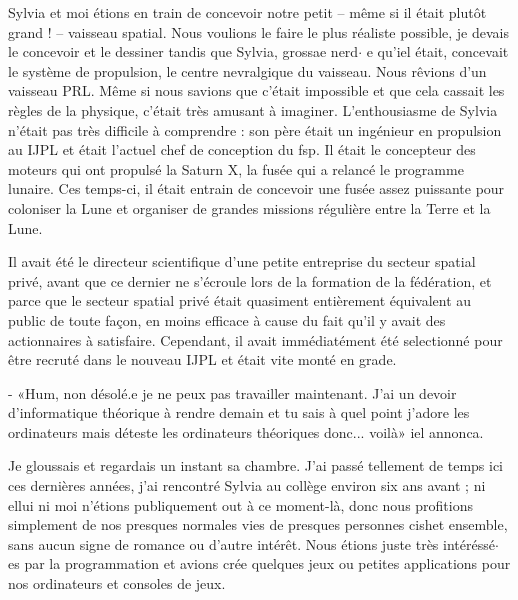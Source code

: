 \documentclass[12pt,hidelinks,a4paper]{book}
\begin{document}
Sylvia et moi étions en train de concevoir notre petit -- même si
il était plutôt grand ! -- vaisseau spatial. Nous voulions le faire
le plus réaliste possible, je devais le concevoir et le dessiner tandis
que Sylvia, grossae nerd$\cdot$ e qu'iel était, concevait le système de propulsion,
le centre nevralgique du vaisseau. Nous rêvions d'un vaisseau PRL.
Même si nous savions que c'était impossible et que cela cassait les
règles de la physique, c'était très amusant à imaginer. L'enthousiasme
de Sylvia n'était pas très difficile à comprendre : son père était
un ingénieur en propulsion au IJPL et était l'actuel chef de conception
du \gls{fsp}. Il était le concepteur des moteurs qui ont propulsé
la Saturn X, la fusée qui a relancé le programme lunaire. Ces temps-ci,
il était entrain de concevoir une fusée assez puissante pour coloniser
la Lune et organiser de grandes missions régulière entre la Terre
et la Lune.

\bigskip

Il avait été le directeur scientifique d'une petite entreprise du
secteur spatial privé, avant que ce dernier ne s'écroule lors de la
formation de la fédération, et parce que le secteur spatial privé
était quasiment entièrement équivalent au public de toute façon, en
moins efficace à cause du fait qu'il y avait des actionnaires à satisfaire.
Cependant, il avait immédiatément été selectionné pour être recruté
dans le nouveau IJPL et était vite monté en grade.

\bigskip

- «Hum, non désolé.e je ne peux pas travailler maintenant. J'ai
un devoir d'informatique théorique à rendre demain et tu sais à quel
point j'adore les ordinateurs mais déteste les ordinateurs théoriques
donc... voilà» iel annonca. 

\bigskip

Je gloussais et regardais un instant sa chambre. J'ai passé tellement
de temps ici ces dernières années, j'ai rencontré Sylvia au collège
environ six ans avant ; ni ellui ni moi n'étions publiquement out
à ce moment-là, donc nous profitions simplement de nos presques normales
vies de presques personnes cishet ensemble, sans aucun signe de romance
ou d'autre intérêt. Nous étions juste très intéréssé$\cdot$ es par la programmation
et avions crée quelques jeux ou petites applications pour nos ordinateurs
et consoles de jeux.

\bigskip
\end{document}
